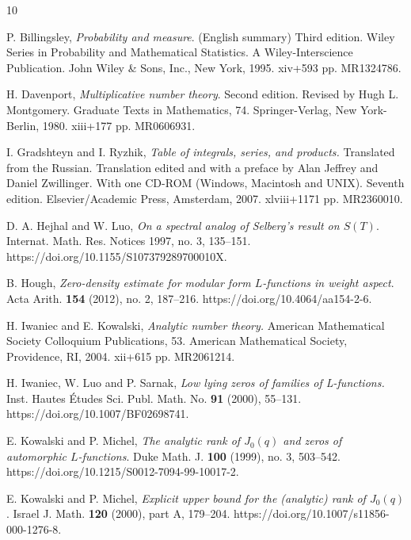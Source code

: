 \documentclass[11pt,reqno]{amsart}
\numberwithin{equation}{section}
\theoremstyle{plain}
\theoremstyle{definition}
\begin{document}

\begin{thebibliography}{10}

P. Billingsley,
{\it Probability and measure}. (English summary)
Third edition. Wiley Series in Probability and Mathematical Statistics. A Wiley-Interscience Publication.
John Wiley \& Sons, Inc., New York, 1995. xiv+593 pp. MR1324786.

H. Davenport,
{\it Multiplicative number theory}.
Second edition. Revised by Hugh L. Montgomery. Graduate Texts in Mathematics, 74.
Springer-Verlag, New York-Berlin, 1980. xiii+177 pp.
MR0606931.


I. Gradshteyn and I. Ryzhik,
\textit{Table of integrals, series, and products.}
Translated from the Russian. Translation edited and with a preface by Alan Jeffrey and Daniel Zwillinger.
With one CD-ROM (Windows, Macintosh and UNIX). 
Seventh edition. Elsevier/Academic Press, Amsterdam, 2007. xlviii+1171 pp.
MR2360010.

D. A. Hejhal and W. Luo, {\it On a spectral analog of Selberg's result on $S(T)$}.
Internat. Math. Res. Notices 1997, no. 3, 135--151. 
https://doi.org/10.1155/S107379289700010X.

B. Hough, {\it Zero-density estimate for modular form $L$-functions in weight aspect}.
Acta Arith. \textbf{154} (2012), no. 2, 187--216.
https://doi.org/10.4064/aa154-2-6.

H. Iwaniec and E. Kowalski, {\it Analytic number theory.} 
American Mathematical Society Colloquium Publications, 53. 
American Mathematical Society, Providence, RI, 2004. xii+615 pp.
MR2061214.

H. Iwaniec, W. Luo and P. Sarnak,
{\it Low lying zeros of families of L-functions.}
Inst. Hautes \'{E}tudes Sci. Publ. Math. No. \textbf{91} (2000), 55--131.
https://doi.org/10.1007/BF02698741.

E. Kowalski and P. Michel,
{\it The analytic rank of $J_0(q)$ and zeros of automorphic $L$-functions}.
Duke Math. J. \textbf{100} (1999), no. 3, 503--542.
https://doi.org/10.1215/S0012-7094-99-10017-2.

E. Kowalski and P. Michel,
{\it Explicit upper bound for the (analytic) rank of $J_0(q)$}. Israel J. Math. \textbf{120} (2000), part A, 179--204.
https://doi.org/10.1007/s11856-000-1276-8.


\end{thebibliography}
\end{document}
